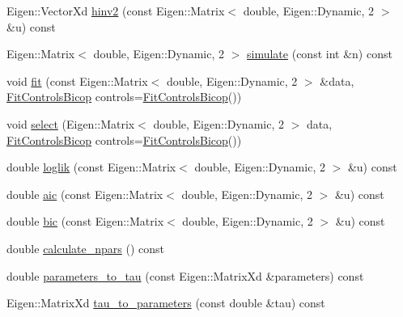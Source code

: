 \begin{DoxyCompactItemize}
\item 
Eigen\+::\+Vector\+Xd \hyperlink{classvinecopulib_1_1_bicop_a52c8d47c7ccf77f69c1c6902856c0e35}{hinv2} (const Eigen\+::\+Matrix$<$ double, Eigen\+::\+Dynamic, 2 $>$ \&u) const 
\item 
Eigen\+::\+Matrix$<$ double, Eigen\+::\+Dynamic, 2 $>$ \hyperlink{classvinecopulib_1_1_bicop_a79e63e141e636908fe6727d5bed222a3}{simulate} (const int \&n) const 
\item 
void \hyperlink{classvinecopulib_1_1_bicop_a2d509a8b404a73ef17f04a0678e90a71}{fit} (const Eigen\+::\+Matrix$<$ double, Eigen\+::\+Dynamic, 2 $>$ \&data, \hyperlink{classvinecopulib_1_1_fit_controls_bicop}{Fit\+Controls\+Bicop} controls=\hyperlink{classvinecopulib_1_1_fit_controls_bicop}{Fit\+Controls\+Bicop}())
\item 
void \hyperlink{classvinecopulib_1_1_bicop_af20af5c3ba6565628987b4784e9ac348}{select} (Eigen\+::\+Matrix$<$ double, Eigen\+::\+Dynamic, 2 $>$ data, \hyperlink{classvinecopulib_1_1_fit_controls_bicop}{Fit\+Controls\+Bicop} controls=\hyperlink{classvinecopulib_1_1_fit_controls_bicop}{Fit\+Controls\+Bicop}())
\item 
double \hyperlink{classvinecopulib_1_1_bicop_ad1ee397f2273ed07ba1d5d2ebff7ef1f}{loglik} (const Eigen\+::\+Matrix$<$ double, Eigen\+::\+Dynamic, 2 $>$ \&u) const 
\item 
double \hyperlink{classvinecopulib_1_1_bicop_afa2b49c6c6da183f8cb365981d4d559c}{aic} (const Eigen\+::\+Matrix$<$ double, Eigen\+::\+Dynamic, 2 $>$ \&u) const 
\item 
double \hyperlink{classvinecopulib_1_1_bicop_a5935f84a33d80dbe7cbc6d071a1e8d75}{bic} (const Eigen\+::\+Matrix$<$ double, Eigen\+::\+Dynamic, 2 $>$ \&u) const 
\item 
double \hyperlink{classvinecopulib_1_1_bicop_a6fbc58e9d4cd565e805347083cbcc63d}{calculate\+\_\+npars} () const 
\item 
double \hyperlink{classvinecopulib_1_1_bicop_ac244ca18350854951708a360e5e508ed}{parameters\+\_\+to\+\_\+tau} (const Eigen\+::\+Matrix\+Xd \&parameters) const 
\item 
Eigen\+::\+Matrix\+Xd \hyperlink{classvinecopulib_1_1_bicop_afd2d6a3ae7349d06f79a3c2e5877c17e}{tau\+\_\+to\+\_\+parameters} (const double \&tau) const 
\end{DoxyCompactItemize}
